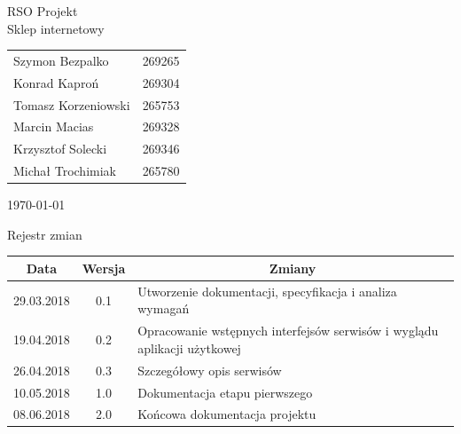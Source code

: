 \documentclass[11pt,a4paper,twoside]{article}
\begin{document}
\begin{center}
\vspace*{3\baselineskip}
{\LARGE{RSO Projekt}}
\\
\vspace*{2\baselineskip}
{\Large{Sklep internetowy}}
\\
\vspace*{2\baselineskip}
\begin{table}[ht]
\label{autors}
\centering
\begin{tabular}{ll}
	Szymon Bezpalko & 269265\\
	Konrad Kaproń & 269304\\
	Tomasz Korzeniowski & 265753\\
	Marcin Macias & 269328\\
	Krzysztof Solecki & 269346\\
	Michał Trochimiak & 265780\\
\end{tabular}
\end{table}

\vspace*{2\baselineskip}
\today
\end{center}
\vspace*{3\baselineskip}
\begin{center}
Rejestr zmian
\end{center}

\begin{table}[ht]
\label{changelog}
\centering
\begin{tabular}{|c|c|l|}
\hline
 Data & Wersja & \multicolumn{1}{c|}{Zmiany} \\\hline
 29.03.2018 & 0.1 & Utworzenie dokumentacji, specyfikacja i analiza wymagań \\\hline
 19.04.2018 & 0.2 & Opracowanie wstępnych interfejsów serwisów i wyglądu aplikacji użytkowej \\\hline
 26.04.2018 & 0.3 & Szczegółowy opis serwisów \\\hline
 10.05.2018 & 1.0 & Dokumentacja etapu pierwszego\\\hline
 08.06.2018 & 2.0 & Końcowa dokumentacja projektu \\\hline
\end{tabular}
\end{table}
\newpage
\tableofcontents
\end{document}

